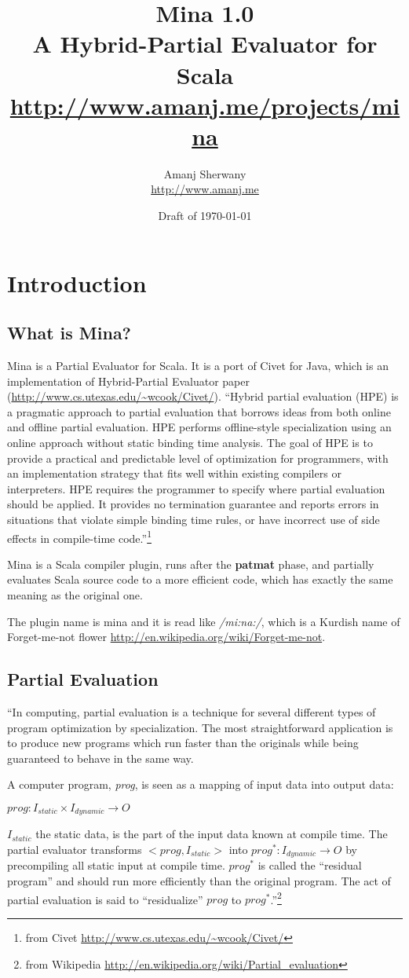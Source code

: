 \documentclass[10pt, a4paper]{article}
\title{\textbf{\huge{Mina 1.0}}\\ \large{A Hybrid-Partial Evaluator for Scala}\\
  \small{\url{http://www.amanj.me/projects/mina}}}
\author{Amanj Sherwany \\ \small{\url{http://www.amanj.me}}}
\date{Draft of \today}
\begin{document}
\maketitle
{}

\tableofcontents
\newpage

\section{Introduction}
\subsection{What is Mina?}
Mina is a Partial Evaluator for Scala. It is a port of Civet for Java, which is
an implementation of Hybrid-Partial Evaluator paper
(\url{http://www.cs.utexas.edu/~wcook/Civet/}). ``Hybrid partial evaluation
(HPE) is a pragmatic approach to partial evaluation that borrows ideas from
both online and offline partial evaluation. HPE performs offline-style
specialization using an online approach without static binding time analysis.
The goal of HPE is to provide a practical and predictable level of optimization
for programmers, with an implementation strategy that fits well within existing
compilers or interpreters. HPE requires the programmer to specify where partial
evaluation should be applied. It provides no termination guarantee and reports
errors in situations that violate simple binding time rules, or have incorrect
use of side effects in compile-time code.''\footnote{from Civet
\url{http://www.cs.utexas.edu/~wcook/Civet/}}

Mina is a Scala compiler plugin, runs after the \textbf{patmat} phase, and
partially evaluates Scala source code to a more efficient code, which has
exactly the same meaning as the original one.

The plugin name is mina and it is read like \emph{/mi:na:/}, which is a Kurdish
name of Forget-me-not flower \url{http://en.wikipedia.org/wiki/Forget-me-not}.


\subsection{Partial Evaluation}
``In computing, partial evaluation is a technique for several different types
of program optimization by specialization. The most straightforward application
is to produce new programs which run faster than the originals while being
guaranteed to behave in the same way.

A computer program, \emph{prog}, is seen as a mapping of input data into output
data:
\centerline{$prog: I_{static} \times I_{dynamic} \to O$}
$I_{static}$ the static data, is the part of the input data known at compile
time. The partial evaluator transforms $<prog, I_{static}>$ into $prog^{*}:
I_{dynamic} \to O$ by precompiling all static input at compile time. $prog^{*}$
is called the ``residual program'' and should run more efficiently than the
original program. The act of partial evaluation is said to ``residualize''
$prog$ to $prog^*$.''\footnote{from Wikipedia
\url{http://en.wikipedia.org/wiki/Partial_evaluation}}
\end{document}
